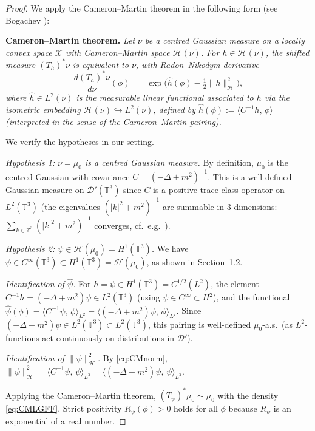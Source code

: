 \documentclass[12pt]{article}
\theoremstyle{definition}
\begin{document}
\begin{proof}
We apply the Cameron--Martin theorem in the following form (see Bogachev
\cite[Theorem 2.4.5 and Corollary 2.4.3]{Bogachev1998}):

\textbf{Cameron--Martin theorem.}
\emph{Let $\nu$ be a centred Gaussian measure on a locally convex space $\mathcal{X}$ with
Cameron--Martin space $\mathcal{H}(\nu)$.  For $h\in\mathcal{H}(\nu)$, the shifted measure
$(T_h)^*\nu$ is equivalent to $\nu$, with Radon--Nikodym derivative}
\[
  \frac{d(T_h)^*\nu}{d\nu}(\phi)
  \;=\; \exp\!\bigl(\hat{h}(\phi) - \tfrac{1}{2}\|h\|_{\mathcal{H}}^2\bigr),
\]
\emph{where $\hat{h}\in L^2(\nu)$ is the measurable linear functional associated to $h$ via the
isometric embedding $\mathcal{H}(\nu)\hookrightarrow L^2(\nu)$, defined by
$\hat{h}(\phi) := \langle C^{-1}h,\,\phi\rangle$ (interpreted in the sense of the Cameron--Martin
pairing).}

We verify the hypotheses in our setting.

\textit{Hypothesis 1: $\nu = \mu_0$ is a centred Gaussian measure.}  By definition, $\mu_0$ is the
centred Gaussian with covariance $C = (-\Delta+m^2)^{-1}$.  This is a well-defined Gaussian
measure on $\mathcal{D}'(\mathbb{T}^3)$ since $C$ is a positive trace-class operator on
$L^2(\mathbb{T}^3)$ (the eigenvalues $(|k|^2+m^2)^{-1}$ are summable in 3 dimensions:
$\sum_{k\in\mathbb{Z}^3}(|k|^2+m^2)^{-1}$ converges, cf.\ e.g.\ \cite[p.~25]{GlimmJaffe1987}).

\textit{Hypothesis 2: $\psi\in\mathcal{H}(\mu_0) = H^1(\mathbb{T}^3)$.}
We have $\psi\in C^\infty(\mathbb{T}^3)\subset H^1(\mathbb{T}^3) = \mathcal{H}(\mu_0)$, as shown in
Section~1.2.

\textit{Identification of $\hat\psi$.}  For $h = \psi\in H^1(\mathbb{T}^3) = C^{1/2}(L^2)$, the
element $C^{-1}h = (-\Delta+m^2)\psi\in L^2(\mathbb{T}^3)$ (using $\psi\in C^\infty\subset H^2$),
and the functional $\hat\psi(\phi) = \langle C^{-1}\psi,\,\phi\rangle_{L^2} = \langle (-\Delta+m^2)\psi,\,\phi\rangle_{L^2}$.
Since $(-\Delta+m^2)\psi\in L^2(\mathbb{T}^3)\subset L^2(\mathbb{T}^3)$, this pairing is
well-defined $\mu_0$-a.s.~(as $L^2$-functions act continuously on distributions in
$\mathcal{D}'$).

\textit{Identification of $\|\psi\|_{\mathcal{H}}^2$.}
By \eqref{eq:CMnorm},
$\|\psi\|_{\mathcal{H}}^2 = \langle C^{-1}\psi,\,\psi\rangle_{L^2} = \langle (-\Delta+m^2)\psi,\,\psi\rangle_{L^2}$.

Applying the Cameron--Martin theorem, $(T_\psi)^*\mu_0\sim\mu_0$ with the density
\eqref{eq:CMLGFF}.  Strict positivity $R_\psi(\phi)>0$ holds for all $\phi$ because $R_\psi$
is an exponential of a real number.
\end{proof}
\end{document}
